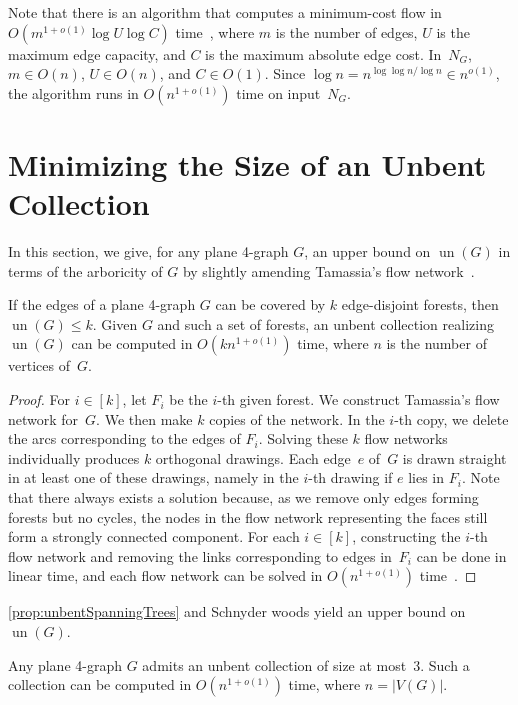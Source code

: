 \documentclass[runningheads]{llncs}
\newcommand{\un}{\operatorname{un}}
\begin{document}
Note that there is an algorithm that computes a minimum-cost flow in $O(m^{1+o(1)}\log U \log C)$ 
time~\cite{DBLP:conf/focs/Brand0PKLGSS23},
where $m$ is the number of edges, $U$ is the maximum edge capacity,
and $C$ is the maximum absolute edge cost.
In~$N_G$, $m \in O(n)$, $U \in O(n)$, and $C \in O(1)$.
Since $\log n = n^{\log\log n / \log n} \in n^{o(1)}$,
the algorithm %
runs in $O(n^{1 + o(1)})$ time on input~$N_G$.


\section{Minimizing the Size of an Unbent Collection}
\label{se:unbent}

In this section, we give, for any plane 4-graph $G$, an upper bound on $\un(G)$ in terms of the arboricity of $G$ by slightly amending Tamassia's flow network~\cite{t-oeggwmnb-sjc}.
\begin{proposition}\label{prop:unbentSpanningTrees}
    If the edges of a plane 4-graph $G$ can be covered by $k$ edge-disjoint forests, then $\un(G)\le k$.
    Given $G$ and such a set of forests, an unbent collection
    realizing $\un(G)$ can be computed in $O(kn^{1 + o(1)})$ time, where $n$ is the number of vertices of~$G$.
\end{proposition}
\begin{proof}
    For $i \in [k]$, let $F_i$ be the $i$-th given forest.
    We construct Tamassia's flow network for~$G$.
    We then make $k$ copies of the network. %
    In the $i$-th copy, we delete the arcs corresponding to the edges
    of $F_i$.
    Solving these $k$ flow networks individually produces $k$ orthogonal drawings.
    Each edge~$e$ of~$G$ is drawn straight in at least one of these drawings, namely in the $i$-th drawing if $e$ lies in $F_i$.
    Note that there always exists a solution because,
    as we remove only edges forming forests but no cycles,
    the nodes in the flow network representing the faces
    still form a strongly connected component.
    For each $i \in [k]$, constructing the $i$-th flow network and
    removing the links corresponding to edges in~$F_i$
    can be done in linear time,
    and each flow network can be solved in $O(n^{1 + o(1)})$ time~\cite{DBLP:conf/focs/Brand0PKLGSS23}.
\end{proof}

\cref{prop:unbentSpanningTrees} and 
Schnyder woods \cite{DBLP:conf/soda/Schnyder90} yield %
an upper bound on $\un(G)$.

\begin{theorem}
    \label{Thm:unbentnumberlessthan3}
    Any plane 4-graph $G$ admits an unbent collection
    of size at most~$3$.  Such a collection can be computed
    in $O(n^{1 + o(1)})$ time, where $n = |V(G)|$.
\end{theorem}
\end{document}
